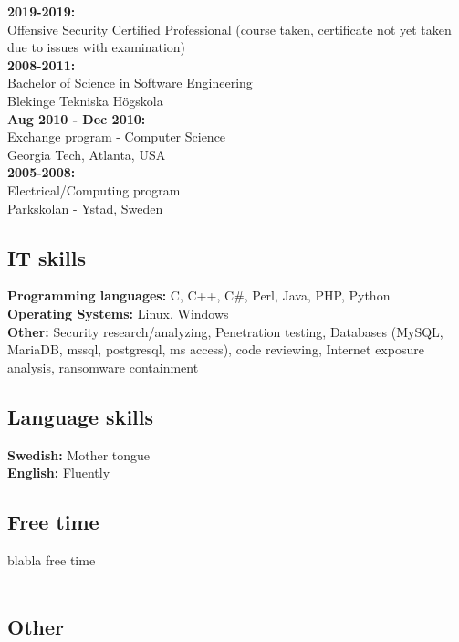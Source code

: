 \documentclass[12pt,a4paper,oneside]{article}
\begin{document}
\textbf{2019-2019:} \\
Offensive Security Certified Professional (course taken, certificate not yet taken due to issues with examination) \\
\textbf{2008-2011:} \\
Bachelor of Science in Software Engineering \\
Blekinge Tekniska Högskola \\
\textbf{Aug 2010 - Dec 2010:} \\
Exchange program - Computer Science \\
Georgia Tech, Atlanta, USA \\
\textbf{2005-2008:} \\
Electrical/Computing program \\
Parkskolan - Ystad, Sweden \\

\subsection*{IT skills}

\textbf{Programming languages:} C, C++, C\#, Perl, Java, PHP, Python \\
\textbf{Operating Systems:} Linux, Windows \\
\textbf{Other:} Security research/analyzing, Penetration testing, Databases (MySQL, MariaDB, mssql,
postgresql, ms access), code reviewing, Internet exposure analysis, ransomware containment \\

\subsection*{Language skills}

\textbf{Swedish:} Mother tongue \\
\textbf{English:} Fluently \\

\subsection*{Free time}

blabla free time \\ \\

\newpage 

\subsection*{Other}
\end{document}
